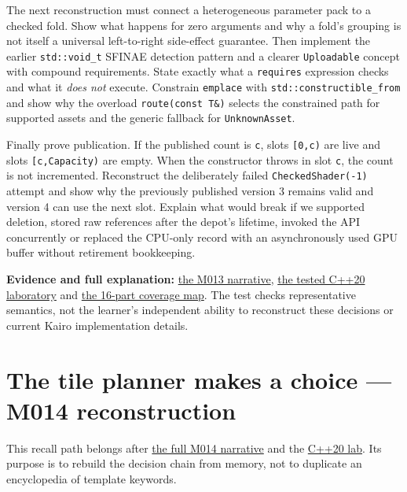 The next reconstruction must connect a heterogeneous parameter pack to a checked fold. Show what happens for zero arguments and why a fold's grouping is not itself a universal left-to-right side-effect guarantee. Then implement the earlier \texttt{std::void\_t} SFINAE detection pattern and a clearer \texttt{Uploadable} concept with compound requirements. State exactly what a \texttt{requires} expression checks and what it \emph{does not} execute. Constrain \texttt{emplace} with \texttt{std::constructible\_from} and show why the overload \texttt{route(const\ T\&)} selects the constrained path for supported assets and the generic fallback for \texttt{UnknownAsset}.

Finally prove publication. If the published count is \texttt{c}, slots \texttt{{[}0,c)} are live and slots \texttt{{[}c,Capacity)} are empty. When the constructor throws in slot \texttt{c}, the count is not incremented. Reconstruct the deliberately failed \texttt{CheckedShader(-1)} attempt and show why the previously published version 3 remains valid and version 4 can use the next slot. Explain what would break if we supported deletion, stored raw references after the depot's lifetime, invoked the API concurrently or replaced the CPU-only record with an asynchronously used GPU buffer without retirement bookkeeping.

\textbf{Evidence and full explanation:} \href{Continuous\%20Notes/Computing\%20Foundations\%20-\%20From\%20Bits\%20to\%20C++\%20and\%20Systems\%20APIs\#One\%20asset\%20pipeline,\%20many\%20asset\%20types\%20—\%20generic\%20code\%20without\%20accidental\%20promises}{the M013 narrative}, \href{tools/labs/generic_asset_pipeline_lab.cpp}{the tested C++20 laboratory} and \hyperref[appendix-fd090d982a15-m013-parts-201216-generic-asset-preparation-with-constrained-apis]{the 16-part coverage map}. The test checks representative semantics, not the learner's independent ability to reconstruct these decisions or current Kairo implementation details.

\section{The tile planner makes a choice --- M014 reconstruction}\label{appendix-960160274237-the-tile-planner-makes-a-choice-m014-reconstruction}

This recall path belongs after \href{Continuous\%20Notes/Computing\%20Foundations\%20-\%20From\%20Bits\%20to\%20C++\%20and\%20Systems\%20APIs\#A\%20texture\%20tile\%20that\%20chooses\%20its\%20work\%20before\%20the\%20frame\%20begins}{the full M014 narrative} and the \href{tools/labs/compile_time_asset_policy_lab.cpp}{C++20 lab}. Its purpose is to rebuild the decision chain from memory, not to duplicate an encyclopedia of template keywords.

